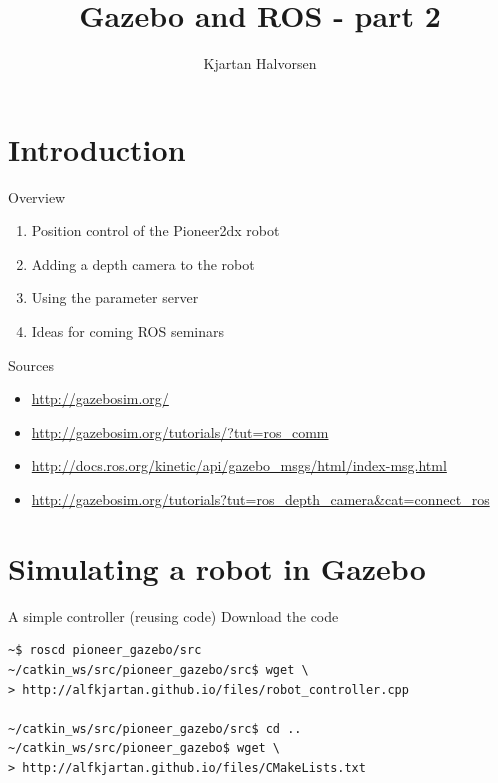 \documentclass[presentation,aspectratio=1610]{beamer}
\author{Kjartan Halvorsen}
\date{}
\title{Gazebo and ROS  - part 2}
\begin{document}
\maketitle

\section{Introduction}
\label{sec-1}
\begin{frame}[label=sec-1-1]{Overview}
\begin{enumerate}
\item Position control of the Pioneer2dx robot
\item Adding a depth camera to the robot
\item Using the parameter server
\item Ideas for coming ROS seminars
\end{enumerate}
\end{frame}

\begin{frame}[label=sec-1-2]{Sources}
\begin{itemize}
\item \url{http://gazebosim.org/}
\item \url{http://gazebosim.org/tutorials/?tut=ros_comm}
\item \url{http://docs.ros.org/kinetic/api/gazebo_msgs/html/index-msg.html}
\item \url{http://gazebosim.org/tutorials?tut=ros_depth_camera&cat=connect_ros}
\end{itemize}
\end{frame}


\section{Simulating a robot in Gazebo}
\label{sec-2}

\begin{frame}[fragile,label=sec-2-1]{A simple controller (reusing code)}
 Download the code

\begin{verbatim}
~$ roscd pioneer_gazebo/src
~/catkin_ws/src/pioneer_gazebo/src$ wget \
> http://alfkjartan.github.io/files/robot_controller.cpp

~/catkin_ws/src/pioneer_gazebo/src$ cd ..
~/catkin_ws/src/pioneer_gazebo$ wget \
> http://alfkjartan.github.io/files/CMakeLists.txt
\end{verbatim}
\end{frame}
\end{document}
